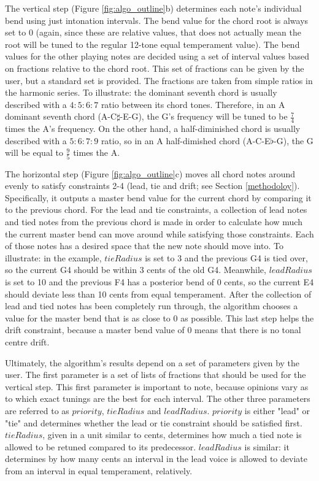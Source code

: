 \documentclass[a4paper]{article}
\begin{document}
The vertical step (Figure \ref{fig:algo_outline}b) determines each note's individual bend using just intonation intervals. The bend value for the chord root is always set to 0 (again, since these are relative values, that does not actually mean the root will be tuned to the regular 12-tone equal temperament value). The bend values for the other playing notes are decided using a set of interval values based on fractions relative to the chord root. This set of fractions can be given by the user, but a standard set is provided. The fractions are taken from simple ratios in the harmonic series. To illustrate: the dominant seventh chord is usually described with a $4:5:6:7$ ratio between its chord tones. Therefore, in an A dominant seventh chord (A-C$\sharp$-E-G), the G's frequency will be tuned to be $\frac74$ times the A's frequency. On the other hand, a half-diminished chord is usually described with a $5:6:7:9$ ratio, so in an A half-dimished chord (A-C-E$\flat$-G), the G will be equal to $\frac95$ times the A.

The horizontal step (Figure \ref{fig:algo_outline}c) moves all chord notes around evenly to satisfy constraints 2-4 (lead, tie and drift; see Section \ref{methodoloy}). Specifically, it outputs a master bend value for the current chord by comparing it to the previous chord. For the lead and tie constraints, a collection of lead notes and tied notes from the previous chord is made in order to calculate how much the current master bend can move around while satisfying those constraints. Each of those notes has a desired space that the new note should move into. To illustrate: in the example, $\mathit{tieRadius}$ is set to 3 and the previous G4 is tied over, so the current G4 should be within 3 cents of the old G4. Meanwhile, $\mathit{leadRadius}$ is set to 10 and the previous F4 has a posterior bend of 0 cents, so the current E4 should deviate less than 10 cents from equal temperament. After the collection of lead and tied notes has been completely run through, the algorithm chooses a value for the master bend that is as close to 0 as possible. This last step helps the drift constraint, because a master bend value of 0 means that there is no tonal centre drift.

Ultimately, the algorithm's results depend on a set of parameters given by the user. The first parameter is a set of lists of fractions that should be used for the vertical step. This first parameter is important to note, because opinions vary as to which exact tunings are the best for each interval. The other three parameters are referred to as $\mathit{priority}$, $\mathit{tieRadius}$ and $\mathit{leadRadius}$. $\mathit{priority}$ is either "lead" or "tie" and determines whether the lead or tie constraint should be satisfied first. $\mathit{tieRadius}$, given in a unit similar to cents, determines how much a tied note is allowed to be retuned compared to its predecessor. $\mathit{leadRadius}$ is similar: it determines by how many cents an interval in the lead voice is allowed to deviate from an interval in equal temperament, relatively.
\end{document}
